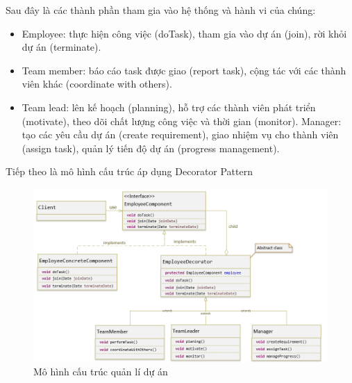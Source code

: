 Sau đây là các thành phần tham gia vào hệ thống và hành vi của chúng:
\begin{itemize}
    \item Employee: thực hiện công việc (doTask), tham gia vào dự án (join), rời khỏi dự án (terminate).
    \item Team member: báo cáo task được giao (report task), cộng tác với các thành viên khác (coordinate with others).
    \item Team lead: lên kế hoạch (planning), hỗ trợ các thành viên phát triển (motivate), theo dõi chất lượng công việc và thời gian (monitor).
    Manager: tạo các yêu cầu dự án (create requirement), giao nhiệm vụ cho thành viên (assign task), quản lý tiến độ dự án (progress management).
\end{itemize}
Tiếp theo là mô hình cấu trúc áp dụng Decorator Pattern
\begin{figure}[!htb]
 \centering
 \includegraphics[width=\textwidth]{fig/Decorator/decorator_example.png}
 \caption{Mô hình cấu trúc quản lí dự án}
 \label{fig:decorator_example}
\end{figure}
 

